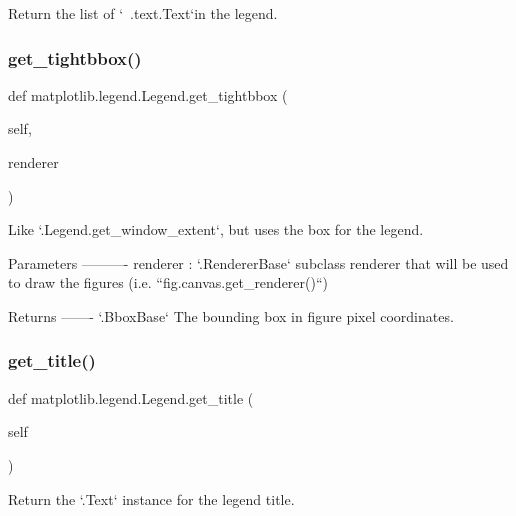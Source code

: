 \begin{DoxyVerb}Return the list of `~.text.Text`\s in the legend.\end{DoxyVerb}
 \mbox{\label{classmatplotlib_1_1legend_1_1Legend_a21c5216eb7c3a1e21491adeb98b70ebf}} 
\subsubsection{\texorpdfstring{get\+\_\+tightbbox()}{get\_tightbbox()}}
{\footnotesize\ttfamily def matplotlib.\+legend.\+Legend.\+get\+\_\+tightbbox (\begin{DoxyParamCaption}\item[{}]{self,  }\item[{}]{renderer }\end{DoxyParamCaption})}

\begin{DoxyVerb}Like `.Legend.get_window_extent`, but uses the box for the legend.

Parameters
----------
renderer : `.RendererBase` subclass
    renderer that will be used to draw the figures (i.e.
    ``fig.canvas.get_renderer()``)

Returns
-------
`.BboxBase`
    The bounding box in figure pixel coordinates.
\end{DoxyVerb}
 \mbox{\label{classmatplotlib_1_1legend_1_1Legend_ab18a4ba69c6dae3f77e845217babcb40}} 
\subsubsection{\texorpdfstring{get\+\_\+title()}{get\_title()}}
{\footnotesize\ttfamily def matplotlib.\+legend.\+Legend.\+get\+\_\+title (\begin{DoxyParamCaption}\item[{}]{self }\end{DoxyParamCaption})}

\begin{DoxyVerb}Return the `.Text` instance for the legend title.\end{DoxyVerb}
 \mbox{\label{classmatplotlib_1_1legend_1_1Legend_a024e2c673df888d607b252ed58ca4eb8}} 
